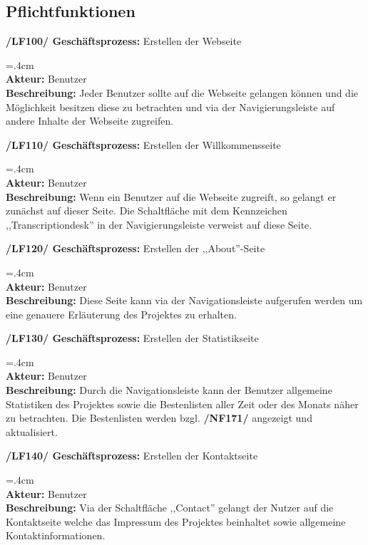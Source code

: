 \documentclass{article}
\newenvironment{funcD}{\vspace{-.6cm}\\\par\begingroup\leftskip=.4cm\noindent\\}{\\\par\endgroup\noindent}
\begin{document}
\subsection*{Pflichtfunktionen}
\textbf{/LF100/ Geschäftsprozess:} Erstellen der Webseite
\begin{funcD}
    \textbf{Akteur:} Benutzer \vspace{.1cm}\\
    \textbf{Beschreibung:} Jeder Benutzer sollte auf die Webseite gelangen können und die Möglichkeit besitzen diese zu betrachten und via der Navigierungsleiste auf andere Inhalte der Webseite zugreifen.   
\end{funcD}
\textbf{/LF110/ Geschäftsprozess:} Erstellen der Willkommensseite
\begin{funcD}
    \textbf{Akteur:} Benutzer\vspace{.1cm}\\
    \textbf{Beschreibung:} Wenn ein Benutzer auf die Webseite zugreift, so gelangt er zunächst auf dieser Seite. Die Schaltfläche mit dem Kennzeichen ,,Transcriptiondesk'' in der Navigierungsleiste verweist auf diese Seite.
\end{funcD}
\textbf{/LF120/ Geschäftsprozess:} Erstellen der ,,About''-Seite
\begin{funcD}
    \textbf{Akteur:} Benutzer\vspace{.1cm}\\
    \textbf{Beschreibung:} Diese Seite kann via der Navigationsleiste aufgerufen werden um eine genauere Erläuterung des Projektes zu erhalten.
\end{funcD}
\textbf{/LF130/ Geschäftsprozess:} Erstellen der Statistikseite
\begin{funcD}
    \textbf{Akteur:} Benutzer\vspace{.1cm}\\
    \textbf{Beschreibung:} Durch die Navigationsleiste kann der Benutzer allgemeine Statistiken des Projektes sowie die Bestenlisten aller Zeit oder des Monats näher zu betrachten. Die Bestenlisten werden bzgl. \textbf{/NF171/} angezeigt und aktualisiert.
\end{funcD}
\textbf{/LF140/ Geschäftsprozess:} Erstellen der Kontaktseite
\begin{funcD}
    \textbf{Akteur:} Benutzer\vspace{.1cm}\\
    \textbf{Beschreibung:} Via der Schaltfläche ,,Contact'' gelangt der Nutzer auf die Kontaktseite welche das Impressum des Projektes beinhaltet sowie allgemeine Kontaktinformationen.
\end{funcD}
\end{document}
